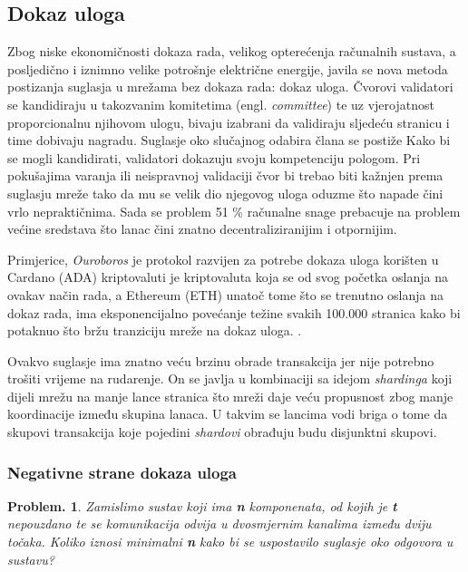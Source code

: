 \documentclass[utf8, zavrsni]{fer}
\begin{document}
\subsection{Dokaz uloga}
Zbog niske ekonomičnosti dokaza rada, velikog opterećenja računalnih sustava, a posljedično i iznimno velike potrošnje električne energije, javila se nova metoda postizanja suglasja u mrežama bez dokaza rada: dokaz uloga. Čvorovi validatori se kandidiraju u takozvanim komitetima (engl. \textit{committee}) te uz vjerojatnost proporcionalnu njihovom ulogu, bivaju izabrani da validiraju sljedeću stranicu i time dobivaju nagradu. Suglasje oko slučajnog odabira člana se postiže  Kako bi se mogli kandidirati, validatori dokazuju svoju kompetenciju pologom. Pri pokušajima varanja ili neispravnoj validaciji čvor bi trebao biti kažnjen prema suglasju mreže tako da mu se velik dio njegovog uloga oduzme što napade čini vrlo nepraktičnima. Sada se problem 51 \% računalne snage prebacuje na problem većine sredstava što lanac čini znatno decentraliziranijim i otpornijim.

Primjerice, \textit{Ouroboros} \cite{ouroboros} je protokol razvijen za potrebe dokaza uloga korišten u Cardano (ADA) kriptovaluti je kriptovaluta koja se od svog početka oslanja na ovakav način rada, a Ethereum (ETH) unatoč tome što se trenutno oslanja na dokaz rada, ima eksponencijalno povećanje težine svakih 100.000 stranica kako bi potaknuo što bržu tranziciju mreže na dokaz uloga. \cite{wood2014ethereum}.

Ovakvo suglasje ima znatno veću brzinu obrade transakcija jer nije potrebno trošiti vrijeme na rudarenje. On se javlja u kombinaciji sa idejom \textit{shardinga} koji dijeli mrežu na manje lance stranica što mreži daje veću propusnost zbog manje koordinacije između skupina lanaca. U takvim se lancima vodi briga o tome da skupovi transakcija koje pojedini \textit{shardovi} obrađuju budu disjunktni skupovi.

\subsubsection{Negativne strane dokaza uloga}
\newtheorem{problem}{Problem.}
\begin{problem}
Zamislimo sustav koji ima \textbf{n} komponenata, od kojih je \textbf{t} nepouzdano te se komunikacija odvija u dvosmjernim kanalima između dviju točaka. Koliko iznosi minimalni \textbf{n} kako bi se uspostavilo suglasje oko odgovora u sustavu?
\end{problem}
\end{document}
